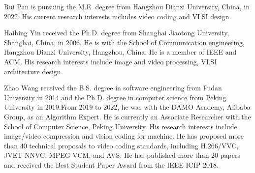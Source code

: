 \documentclass[lettersize,journal]{IEEEtran}
\begin{document}
\begin{IEEEbiography}
 {Rui Pan} is pursuing the M.E. degree from Hangzhou Dianzi University, China, in 2022. His current research interests includes video coding and VLSI design.
\end{IEEEbiography}

\begin{IEEEbiography}
 {Haibing Yin} received the Ph.D. degree from Shanghai Jiaotong University, Shanghai, China, in 2006. He is with the School of Communication engineering, Hangzhou Dianzi University, Hangzhou, China. He is a member of IEEE and ACM. His research interests include image and video processing, VLSI architecture design.
\end{IEEEbiography}

\begin{IEEEbiography}
 {Zhao Wang} received the B.S. degree in software engineering from Fudan University in 2014 and the Ph.D. degree in computer science from Peking University in 2019.From 2019 to 2022, he was with the DAMO Academy, Alibaba Group, as an Algorithm Expert. He is currently an Associate Researcher with the School of Computer Science, Peking University. His research interests include image/video compression and vision coding for machine. He has proposed more than 40 technical proposals to video coding standards, including H.266/VVC, JVET-NNVC, MPEG-VCM, and AVS. He has published more than 20 papers and received the Best Student Paper Award from the IEEE ICIP 2018.
\end{IEEEbiography}
\end{document}
